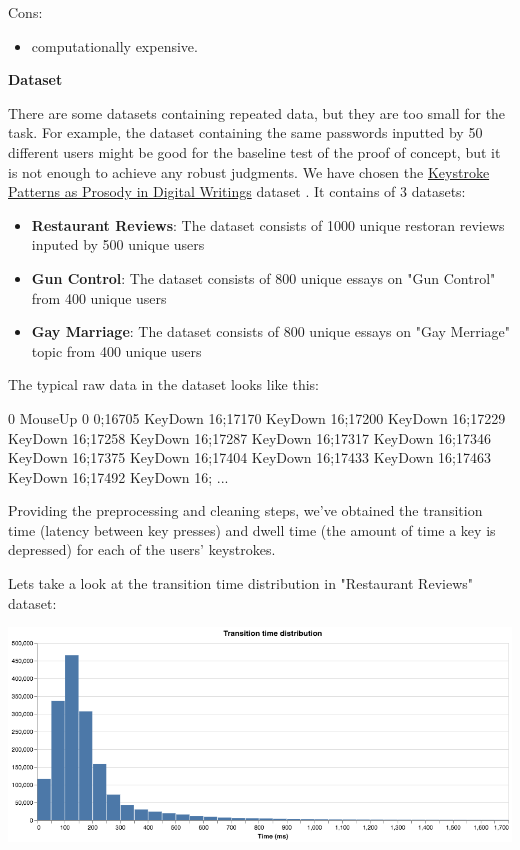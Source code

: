 \documentclass[12pt,a4]{article}
\begin{document}
Cons:
\begin{itemize}
    \item computationally expensive. 
\end{itemize}



\bigskip
\large\textbf{Dataset}
\bigskip

\normalsize
There are some datasets containing repeated data, but they are too small for the task. For example, the dataset containing the same passwords inputted by 50 different users might be good for the baseline test of the proof of concept, but it is not enough to achieve any robust judgments.
We have chosen the  \href{http://www3.cs.stonybrook.edu/~rbanerjee/project-pages/keystrokes/keystrokes.html}{Keystroke Patterns as Prosody in Digital Writings} dataset \cite{banerjee2014_emnlp}. It contains of 3 datasets: \begin{itemize}
	\item \textbf{Restaurant Reviews}: The dataset consists of 1000 unique restoran reviews inputed by 500 unique users
	\item \textbf{Gun Control}: The dataset consists of 800 unique essays on "Gun Control" from 400 unique users
	\item \textbf{Gay Marriage}: The dataset consists of 800 unique essays on "Gay Merriage" topic  from 400 unique users
\end{itemize}

The typical raw data in the dataset looks like this:
\bigskip

\begin{text}
	0 MouseUp 0 0;16705 KeyDown 16;17170 KeyDown 16;17200 KeyDown 16;17229 KeyDown 16;17258 KeyDown 16;17287 KeyDown 16;17317 KeyDown 16;17346 KeyDown 16;17375 KeyDown 16;17404 KeyDown 16;17433 KeyDown 16;17463 KeyDown 16;17492 KeyDown 16; ...
\end{text}

Providing the preprocessing and cleaning steps, we've obtained the transition time (latency between key presses) and dwell time (the amount of time a key is depressed) for each of the users' keystrokes.


Lets take a look at the transition time distribution in "Restaurant Reviews" dataset:
\begin{center}
\centering
\includegraphics[width=0.85\linewidth]{images/transitions_time.png}
\end{center}
\end{document}

